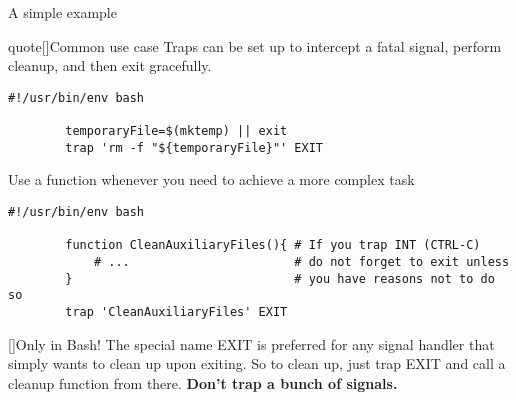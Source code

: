 \begin{frame}[fragile]{A simple example}
    \vspace{-4mm}
    \begin{varblock}{quote}[\textwidth]{Common use case}
        \normalsize\textnormal{Traps can be set up to intercept a fatal signal, perform cleanup, and then exit gracefully.}
    \end{varblock}
    \begin{lstlisting}[style=MyBash, emph={[7]temporaryFile}, belowskip=-5mm]
        #!/usr/bin/env bash

        temporaryFile=$(mktemp) || exit
        trap 'rm -f "${temporaryFile}"' EXIT
    \end{lstlisting}
    Use a function whenever you need to achieve a more complex task
    \begin{lstlisting}[style=MyBash, emph={[7]temporaryFile}, aboveskip=2mm, belowskip=-5mm, xleftmargin=2mm, xrightmargin=3mm, firstnumber=5]
        #!/usr/bin/env bash

        function CleanAuxiliaryFiles(){ # If you trap INT (CTRL-C)
            # ...                       # do not forget to exit unless
        }                               # you have reasons not to do so
        trap 'CleanAuxiliaryFiles' EXIT
    \end{lstlisting}
    \small
    \begin{varblock}{}[\textwidth]{Only in Bash!}
        The special name EXIT is preferred for any signal handler that simply wants to clean up upon exiting.
        So to clean up, just trap EXIT and call a cleanup function from there. \textbf{Don't trap a bunch of signals.}
    \end{varblock}
\end{frame}
